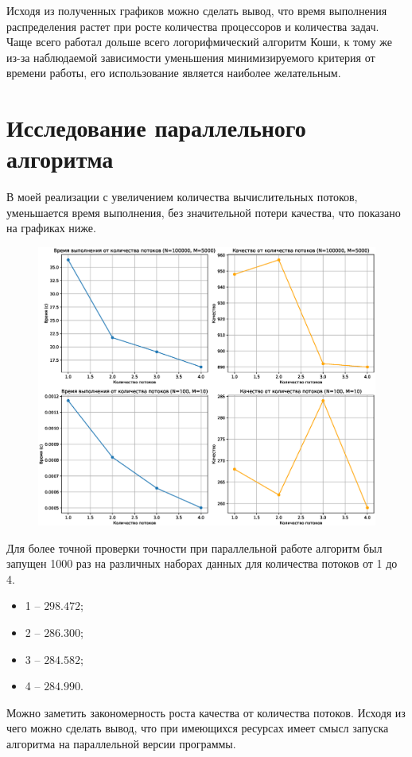 \documentclass[openany, twoside, a4paper, 12pt]{extbook}
\begin{document}
	Исходя из полученных графиков можно сделать вывод, что время выполнения распределения
	растет при росте количества процессоров и количества задач.
	Чаще всего работал дольше всего логорифмический алгоритм Коши, к тому же из-за 
	наблюдаемой зависимости уменьшения минимизируемого критерия от времени работы, 
	его использование является наиболее желательным.

	\section*{Исследование параллельного алгоритма}

	В моей реализации с увеличением количества вычислительных потоков, уменьшается время 
	выполнения, без значительной потери качества, что показано на графиках ниже.

	\begin{figure}[H]
	    \centering
	    \includegraphics[width=\textwidth]{results_parallel_time.eps}
	    \label{fig:parallel}
	\end{figure}


	Для более точной проверки точности при параллельной работе алгоритм был запущен 
	1000 раз на различных наборах данных для количества потоков от 1 до 4. 
	\begin{itemize}
		\item 1 -- $298.472$;
		\item 2 -- $286.300$;
		\item 3 -- $284.582$;
		\item 4 -- $284.990$.
	\end{itemize}
	Можно заметить закономерность роста качества от количества потоков.
	Исходя из чего можно сделать вывод, что при имеющихся ресурсах имеет смысл
	запуска алгоритма на параллельной версии программы.
\end{document}
